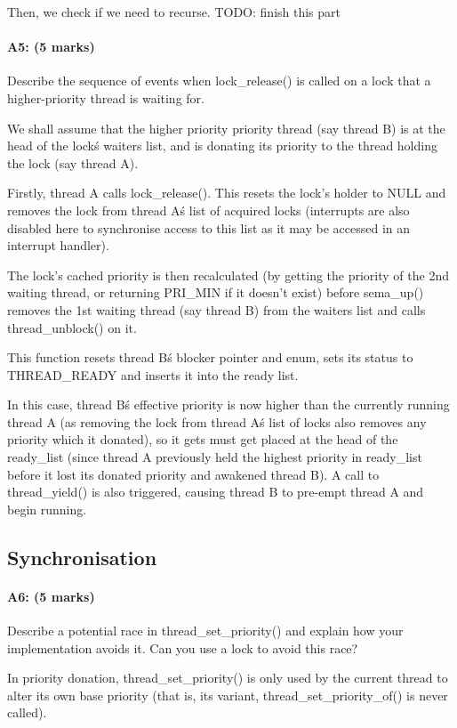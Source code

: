     Then, we check if we need to recurse. TODO: finish this part

\paragraph{A5: (5 marks)}
Describe the sequence of events when lock\_release() is called on a lock that a higher-priority thread is waiting for.

We shall assume that the higher priority priority thread (say thread B) is at the head of the lock\'s waiters list, and is donating its priority to the thread holding the lock (say thread A).

Firstly, thread A calls lock\_release(). This resets the lock's holder to NULL and removes the lock from thread A\'s list of acquired locks (interrupts are also disabled here to synchronise access to this list as it may be accessed in an interrupt handler).

The lock's cached priority is then recalculated (by getting the priority of the 2nd waiting thread, or returning PRI\_MIN if it doesn't exist) before sema\_up() removes the 1st waiting thread (say thread B) from the waiters list and calls thread\_unblock() on it.

This function resets thread B\'s blocker pointer and enum, sets its status to THREAD\_READY and inserts it into the ready list.

In this case, thread B\'s effective priority is now higher than the currently running thread A (as removing the lock from thread A\'s list of locks also removes any priority which it donated), so it gets must get placed at the head of the ready\_list (since thread A previously held the highest priority in ready\_list before it lost its donated priority and awakened thread B). A call to thread\_yield() is also triggered, causing thread B to pre-empt thread A and begin running.

\subsection{Synchronisation}
\paragraph{A6: (5 marks)}
Describe a potential race in thread\_set\_priority() and explain how your implementation avoids it.  Can you use a lock to avoid this race?

In priority donation, thread\_set\_priority() is only used by the current thread to alter its own base priority (that is, its variant, thread\_set\_priority\_of() is never called).

